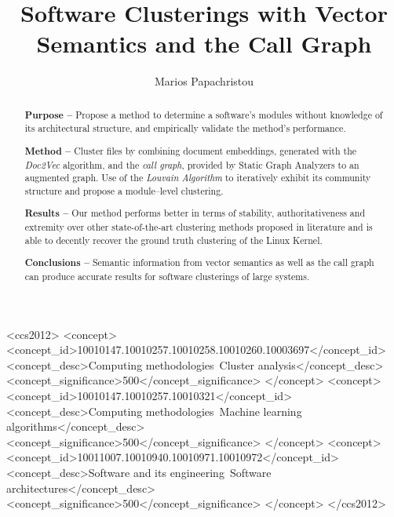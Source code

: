 \documentclass[sigconf,review, anonymous]{acmart}
\begin{document}
%
\title{Software Clusterings with Vector Semantics and 
the Call Graph}

%
\author{Marios Papachristou}


\renewcommand{\shortauthors}{Papachristou}

\begin{abstract}

\noindent \textbf{Purpose -- } Propose a method to determine a software's modules without 
knowledge of its architectural structure, and empirically validate the method's performance.

\noindent \textbf{Method -- } Cluster files by combining document embeddings, generated with the  \emph{Doc2Vec} algorithm, and the \emph{call graph}, provided by Static Graph Analyzers to an augmented graph.
Use of the \emph{Louvain Algorithm} to iteratively exhibit its community structure and propose a module--level clustering. 


\noindent \textbf{Results --} Our method performs better in terms of stability, authoritativeness 
and extremity over other state-of-the-art clustering methods proposed in literature and is able to decently 
recover the ground truth clustering of the Linux Kernel. 

\noindent \textbf{Conclusions --} Semantic information from vector semantics as well as the call graph can produce 
accurate results for software clusterings of large systems.

\end{abstract}

%
%
\begin{CCSXML}
<ccs2012>
<concept>
<concept_id>10010147.10010257.10010258.10010260.10003697</concept_id>
<concept_desc>Computing methodologies~Cluster analysis</concept_desc>
<concept_significance>500</concept_significance>
</concept>
<concept>
<concept_id>10010147.10010257.10010321</concept_id>
<concept_desc>Computing methodologies~Machine learning algorithms</concept_desc>
<concept_significance>500</concept_significance>
</concept>
<concept>
<concept_id>10011007.10010940.10010971.10010972</concept_id>
<concept_desc>Software and its engineering~Software architectures</concept_desc>
<concept_significance>500</concept_significance>
</concept>
</ccs2012>
\end{CCSXML}
\end{document}

